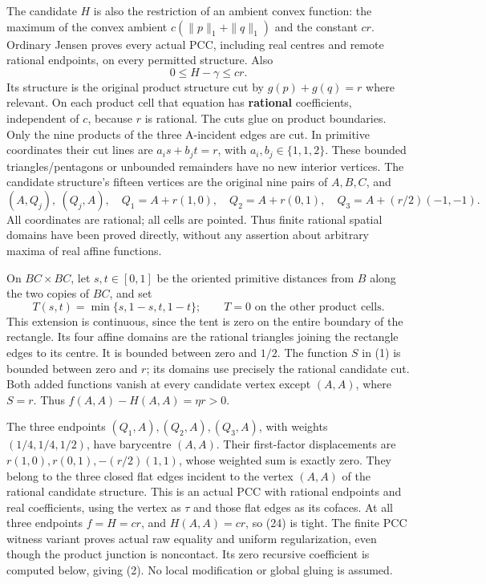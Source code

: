 \documentclass[
  10pt,
]{article}
\begin{document}
The candidate \(H\) is also the restriction of an ambient convex
function: the maximum of the convex ambient \(c(\|p\|_1+\|q\|_1)\) and
the constant \(cr\). Ordinary Jensen proves every actual PCC, including
real centres and remote rational endpoints, on every permitted
structure. Also \[
 0\leq H-\gamma\leq cr.                                      \tag{13}
\] Its structure is the original product structure cut by
\(g(p)+g(q)=r\) where relevant. On each product cell that equation has
\textbf{rational} coefficients, independent of \(c\), because \(r\) is
rational. The cuts glue on product boundaries. Only the nine products of
the three A-incident edges are cut. In primitive coordinates their cut
lines are \(a_is+b_jt=r\), with \(a_i,b_j\in\{1,1,2\}\). These bounded
triangles/pentagons or unbounded remainders have no new interior
vertices. The candidate structure's fifteen vertices are the original
nine pairs of \(A,B,C\), and \[
 (A,Q_j),\ (Q_j,A),\quad
 Q_1=A+r(1,0),\quad Q_2=A+r(0,1),\quad Q_3=A+(r/2)(-1,-1).     \tag{14}
\] All coordinates are rational; all cells are pointed. Thus finite
rational spatial domains have been proved directly, without any
assertion about arbitrary maxima of real affine functions.

On \(BC\times BC\), let \(s,t\in[0,1]\) be the oriented primitive
distances from \(B\) along the two copies of \(BC\), and set \[
 T(s,t)=\min\{s,1-s,t,1-t\};\qquad T=0\text{ on the other product cells}. \tag{15}
\] This extension is continuous, since the tent is zero on the entire
boundary of the rectangle. Its four affine domains are the rational
triangles joining the rectangle edges to its centre. It is bounded
between zero and \(1/2\). The function \(S\) in (1) is bounded between
zero and \(r\); its domains use precisely the rational candidate cut.
Both added functions vanish at every candidate vertex except \((A,A)\),
where \(S=r\). Thus \(f(A,A)-H(A,A)=\eta r>0\).

The three endpoints \((Q_1,A),(Q_2,A),(Q_3,A)\), with weights
\((1/4,1/4,1/2)\), have barycentre \((A,A)\). Their first-factor
displacements are \(r(1,0),r(0,1),-(r/2)(1,1)\), whose weighted sum is
exactly zero. They belong to the three closed flat edges incident to the
vertex \((A,A)\) of the rational candidate structure. This is an actual
PCC with rational endpoints and real coefficients, using the vertex as
\(\tau\) and those flat edges as its cofaces. At all three endpoints
\(f=H=cr\), and \(H(A,A)=cr\), so (24) is tight. The finite PCC witness
variant proves actual raw equality and uniform regularization, even
though the product junction is noncontact. Its zero recursive
coefficient is computed below, giving (2). No local modification or
global gluing is assumed.
\end{document}
